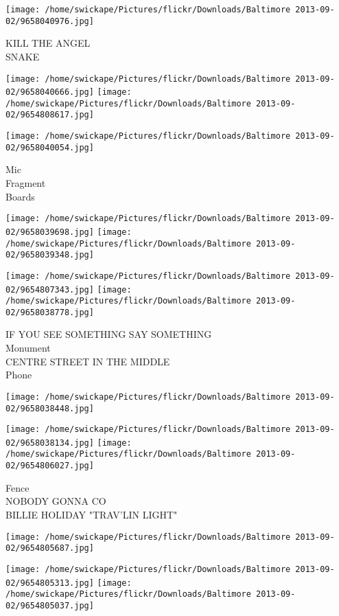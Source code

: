 \documentclass[10pt,letterpaper]{article}
\begin{document}
\vspace{0.25in}
\texttt{[image: /home/swickape/Pictures/flickr/Downloads/Baltimore 2013-09-02/9658040976.jpg]}

KILL THE ANGEL\\
SNAKE
\pagebreak

\texttt{[image: /home/swickape/Pictures/flickr/Downloads/Baltimore 2013-09-02/9658040666.jpg]}
\texttt{[image: /home/swickape/Pictures/flickr/Downloads/Baltimore 2013-09-02/9654808617.jpg]}

\vspace{0.25in}
\texttt{[image: /home/swickape/Pictures/flickr/Downloads/Baltimore 2013-09-02/9658040054.jpg]}

Mic\\
Fragment\\
Boards
\pagebreak

\texttt{[image: /home/swickape/Pictures/flickr/Downloads/Baltimore 2013-09-02/9658039698.jpg]}
\texttt{[image: /home/swickape/Pictures/flickr/Downloads/Baltimore 2013-09-02/9658039348.jpg]}

\texttt{[image: /home/swickape/Pictures/flickr/Downloads/Baltimore 2013-09-02/9654807343.jpg]}
\texttt{[image: /home/swickape/Pictures/flickr/Downloads/Baltimore 2013-09-02/9658038778.jpg]}

IF YOU SEE SOMETHING SAY SOMETHING\\
Monument\\
CENTRE STREET IN THE MIDDLE\\
Phone
\pagebreak

\texttt{[image: /home/swickape/Pictures/flickr/Downloads/Baltimore 2013-09-02/9658038448.jpg]}

\vspace{0.25in}
\texttt{[image: /home/swickape/Pictures/flickr/Downloads/Baltimore 2013-09-02/9658038134.jpg]}
\texttt{[image: /home/swickape/Pictures/flickr/Downloads/Baltimore 2013-09-02/9654806027.jpg]}

Fence\\
NOBODY GONNA CO\\
BILLIE HOLIDAY "TRAV'LIN LIGHT"
\pagebreak

\texttt{[image: /home/swickape/Pictures/flickr/Downloads/Baltimore 2013-09-02/9654805687.jpg]}

\vspace{0.25in}
\texttt{[image: /home/swickape/Pictures/flickr/Downloads/Baltimore 2013-09-02/9654805313.jpg]}
\texttt{[image: /home/swickape/Pictures/flickr/Downloads/Baltimore 2013-09-02/9654805037.jpg]}
\end{document}
